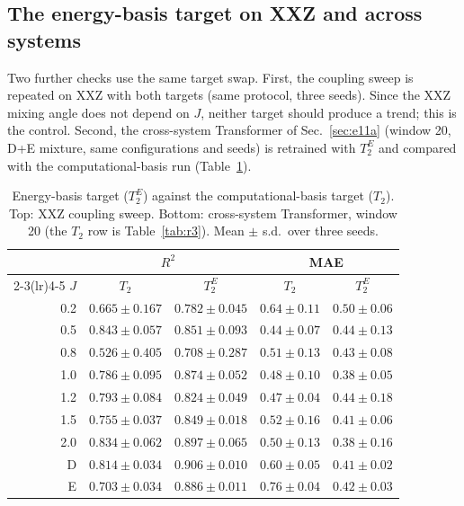 \documentclass[twocolumn,10pt]{article}
\begin{document}
\subsection{The energy-basis target on XXZ and across systems}
\label{sec:r20}

Two further checks use the same target swap.
First, the coupling sweep is repeated on XXZ with both targets (same
protocol, three seeds).
Since the XXZ mixing angle does not depend on $J$, neither target should
produce a trend; this is the control.
Second, the cross-system Transformer of Sec.~\ref{sec:e11a} (window 20,
D+E mixture, same configurations and seeds) is retrained with $T_2^E$ and
compared with the computational-basis run (Table~\ref{tab:r20}).

\begin{table}[h]
\centering
\caption{Energy-basis target ($T_2^E$) against the computational-basis
  target ($T_2$). Top: XXZ coupling sweep. Bottom: cross-system
  Transformer, window 20 (the $T_2$ row is Table~\ref{tab:r3}).
  Mean $\pm$ s.d.\ over three seeds.\label{tab:r20}}
\footnotesize
\setlength{\tabcolsep}{2.5pt}
\begin{tabular}{rcccc}
\toprule
 & \multicolumn{2}{c}{$R^2$} & \multicolumn{2}{c}{MAE} \\
\cmidrule(lr){2-3}\cmidrule(lr){4-5}
$J$ & $T_2$ & $T_2^E$ & $T_2$ & $T_2^E$ \\
\midrule
0.2 & $0.665 \pm 0.167$ & $0.782 \pm 0.045$ & $0.64 \pm 0.11$ & $0.50 \pm 0.06$ \\
0.5 & $0.843 \pm 0.057$ & $0.851 \pm 0.093$ & $0.44 \pm 0.07$ & $0.44 \pm 0.13$ \\
0.8 & $0.526 \pm 0.405$ & $0.708 \pm 0.287$ & $0.51 \pm 0.13$ & $0.43 \pm 0.08$ \\
1.0 & $0.786 \pm 0.095$ & $0.874 \pm 0.052$ & $0.48 \pm 0.10$ & $0.38 \pm 0.05$ \\
1.2 & $0.793 \pm 0.084$ & $0.824 \pm 0.049$ & $0.47 \pm 0.04$ & $0.44 \pm 0.18$ \\
1.5 & $0.755 \pm 0.037$ & $0.849 \pm 0.018$ & $0.52 \pm 0.16$ & $0.41 \pm 0.06$ \\
2.0 & $0.834 \pm 0.062$ & $0.897 \pm 0.065$ & $0.50 \pm 0.13$ & $0.38 \pm 0.16$ \\
\midrule
D & $0.814 \pm 0.034$ & $0.906 \pm 0.010$ & $0.60 \pm 0.05$ & $0.41 \pm 0.02$ \\
E & $0.703 \pm 0.034$ & $0.886 \pm 0.011$ & $0.76 \pm 0.04$ & $0.42 \pm 0.03$ \\
\bottomrule
\end{tabular}
\end{table}
\end{document}
